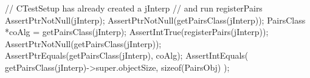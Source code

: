 
\startCTest
  // CTestSetup has already created a jInterp
  // and run registerPairs
  AssertPtrNotNull(jInterp);
  AssertPtrNotNull(getPairsClass(jInterp));
  PairsClass *coAlg = getPairsClass(jInterp);
  AssertIntTrue(registerPairs(jInterp));
  AssertPtrNotNull(getPairsClass(jInterp));
  AssertPtrEquals(getPairsClass(jInterp), coAlg);
  AssertIntEquals(
    getPairsClass(jInterp)->super.objectSize,
    sizeof(PairsObj)
  );
\stopCTest
\stopTestCase
\stopTestSuite

